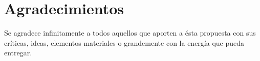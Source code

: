 \chapter*{Agradecimientos}

Se agradece infinitamente a todos aquellos que aporten a ésta propuesta con sus críticas, ideas, elementos materiales o grandemente con la energía que pueda entregar. 